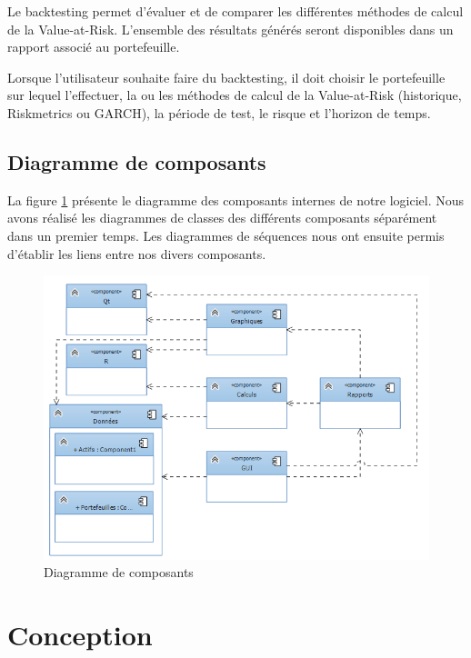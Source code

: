 \documentclass[a4paper,titlepage,french]{report}
\begin{document}
Le backtesting permet d'évaluer et de comparer les différentes méthodes de calcul de la Value-at-Risk.
L'ensemble des résultats générés seront disponibles dans un rapport associé au portefeuille.

Lorsque l'utilisateur souhaite faire du backtesting, il doit choisir le portefeuille sur lequel l'effectuer, la ou les méthodes de calcul de la Value-at-Risk (historique, Riskmetrics ou GARCH), la période de test, le risque et l'horizon de temps.


\section{Diagramme de composants}

La figure \ref{fig:diagramme-composants} présente le diagramme des composants internes de notre logiciel.
Nous avons réalisé les diagrammes de classes des différents composants séparément dans un premier temps.
Les diagrammes de séquences nous ont ensuite permis d'établir les liens entre nos divers composants.

\begin{figure}
  	\center
  	\includegraphics[width=1\textwidth]{architecture_generale.png}
  	\caption{Diagramme de composants}
  	\label{fig:diagramme-composants}
\end{figure}



\chapter{Conception}
\end{document}
